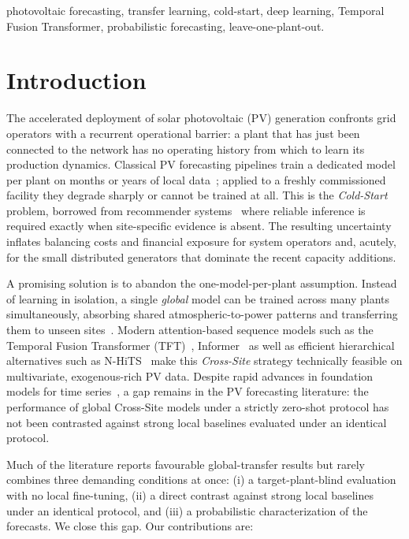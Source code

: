 \documentclass[conference]{IEEEtran}
\begin{document}
\begin{IEEEkeywords}
photovoltaic forecasting, transfer learning, cold-start, deep learning, Temporal Fusion
Transformer, probabilistic forecasting, leave-one-plant-out.
\end{IEEEkeywords}

\section{Introduction}
The accelerated deployment of solar photovoltaic (PV) generation confronts grid operators
with a recurrent operational barrier: a plant that has just been connected to the network
has no operating history from which to learn its production dynamics. Classical PV
forecasting pipelines train a dedicated model per plant on months or years of local
data~\cite{Antonanzas2016}; applied to a freshly commissioned facility they degrade sharply
or cannot be trained at all. This is the \emph{Cold-Start} problem, borrowed from
recommender systems~\cite{Schein2002} where reliable inference is required exactly when
site-specific evidence is absent. The resulting uncertainty inflates balancing costs and
financial exposure for system operators and, acutely, for the small distributed generators
that dominate the recent capacity additions.

A promising solution is to abandon the one-model-per-plant assumption. Instead of learning in
isolation, a single \emph{global} model can be trained across many plants simultaneously,
absorbing shared atmospheric-to-power patterns and transferring them to unseen
sites~\cite{MonteroManso2021,PanYang2010}. Modern attention-based sequence models such as the
Temporal Fusion Transformer (TFT)~\cite{Lim2021}, Informer~\cite{Zhou2021} as well as efficient
hierarchical alternatives such as N-HiTS~\cite{Challu2023} make this \emph{Cross-Site}
strategy technically feasible on multivariate, exogenous-rich PV data. Despite rapid advances
in foundation models for time series~\cite{Ansari2024,Garza2023,Woo2024,Das2024}, a gap
remains in the PV forecasting literature: the performance of global Cross-Site models under a
strictly zero-shot protocol has not been contrasted against strong local baselines evaluated
under an identical protocol.

Much of the literature reports favourable global-transfer results but rarely combines three
demanding conditions at once: (i) a target-plant-blind evaluation with no local fine-tuning,
(ii) a direct contrast against strong local baselines under an identical protocol, and (iii)
a probabilistic characterization of the forecasts. We close this gap. Our contributions are:
\end{document}

